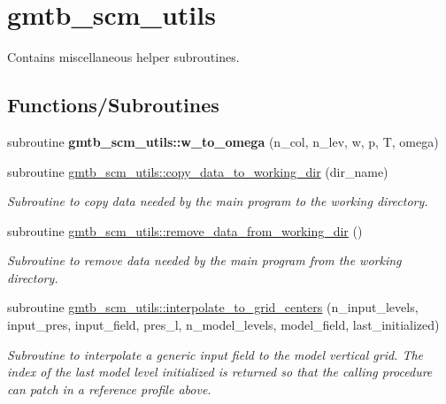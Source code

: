 \hypertarget{group__utils}{}\section{gmtb\+\_\+scm\+\_\+utils}
\label{group__utils}


Contains miscellaneous helper subroutines.  


\subsection*{Functions/\+Subroutines}
\begin{DoxyCompactItemize}
\item 
subroutine {\bfseries gmtb\+\_\+scm\+\_\+utils\+::w\+\_\+to\+\_\+omega} (n\+\_\+col, n\+\_\+lev, w, p, T, omega)\hypertarget{group__utils_ga71de1dc39c1fd3d956cd6aaf5ed91c38}{}\label{group__utils_ga71de1dc39c1fd3d956cd6aaf5ed91c38}

\end{DoxyCompactItemize}
\begin{DoxyCompactItemize}
\item 
subroutine \hyperlink{group__utils_gabb63e1dee42e85425c1a636a6b5449b0}{gmtb\+\_\+scm\+\_\+utils\+::copy\+\_\+data\+\_\+to\+\_\+working\+\_\+dir} (dir\+\_\+name)
\begin{DoxyCompactList}\small\item\em Subroutine to copy data needed by the main program to the working directory. \end{DoxyCompactList}\item 
subroutine \hyperlink{group__utils_ga86425fa83391b0ce1719fa1def3d46e5}{gmtb\+\_\+scm\+\_\+utils\+::remove\+\_\+data\+\_\+from\+\_\+working\+\_\+dir} ()
\begin{DoxyCompactList}\small\item\em Subroutine to remove data needed by the main program from the working directory. \end{DoxyCompactList}\item 
subroutine \hyperlink{group__utils_gadaa5d6afea19af5a67f29f4cde5a94af}{gmtb\+\_\+scm\+\_\+utils\+::interpolate\+\_\+to\+\_\+grid\+\_\+centers} (n\+\_\+input\+\_\+levels, input\+\_\+pres, input\+\_\+field, pres\+\_\+l, n\+\_\+model\+\_\+levels, model\+\_\+field,   last\+\_\+initialized)
\begin{DoxyCompactList}\small\item\em Subroutine to interpolate a generic input field to the model vertical grid. The index of the last model level initialized is returned so that the calling procedure can patch in a reference profile above. \end{DoxyCompactList}\end{DoxyCompactItemize}


